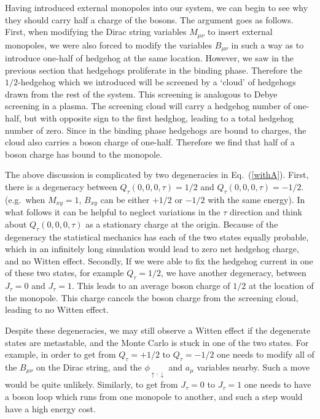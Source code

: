 \documentclass[prb,twocolumn]{revtex4-1}
\begin{document}
Having introduced external monopoles into our system, we can begin to see why they should carry half a charge of the bosons. 
The argument goes as follows. First, when modifying the Dirac string variables $M_{\mu\nu}$ to insert external monopoles, we were also forced to modify the variables $B_{\mu\nu}$ in such a way as to introduce one-half of hedgehog at the same location. However, we saw in the previous section that hedgehogs proliferate in the binding phase. Therefore the $1/2$-hedgehog which we introduced will be screened by a `cloud' of hedgehogs drawn from the rest of the system. This screening is analogous to Debye screening in a plasma. The screening cloud will carry a hedgehog number of one-half, but with opposite sign to the first hedghog, leading to a total hedgehog number of zero. Since in the binding phase hedgehogs are bound to charges, the cloud also carries a boson charge of one-half. Therefore we find that half of a boson charge has bound to the monopole.

The above discussion is complicated by two degeneracies in Eq.~(\ref{withA}). First, there is a degeneracy between $Q_\tau(0,0,0,\tau)=1/2$ and $Q_\tau(0,0,0,\tau)=-1/2$.(e.g.~when $M_{xy}=1$, $B_{xy}$ can be either $+1/2$ or $-1/2$ with the same energy). In what follows it can be helpful to neglect variations in the $\tau$ direction and think about $Q_\tau(0,0,0,\tau)$ as a stationary charge at the origin. Because of the degeneracy the statistical mechanics has each of the two states equally probable, which in an infinitely long simulation would lead to zero net hedgehog charge, and no Witten effect.
Secondly, If we were able to fix the hedgehog current in one of these two states, for example $Q_\tau=1/2$, we have another degeneracy, between $J_\tau=0$ and $J_\tau=1$. This leads to an average boson charge of $1/2$ at the location of the  monopole. This charge cancels the boson charge from the screening cloud, leading to no Witten effect. 

Despite these degeneracies, we may still observe a Witten effect if the degenerate states are metastable, and the Monte Carlo is stuck in one of the two states. For example, in order to get from $Q_\tau=+1/2$ to $Q_\tau=-1/2$ one needs to modify all of the $B_{\mu\nu}$ on the Dirac string, and the $\phi_{\uparrow,\downarrow}$ and $a_{\mu}$ variables nearby. Such a move would be quite unlikely. Similarly, to get from $J_\tau=0$ to $J_\tau=1$ one needs to have a boson loop which runs from one monopole to another, and such a step would have a high energy cost. 
\end{document}
